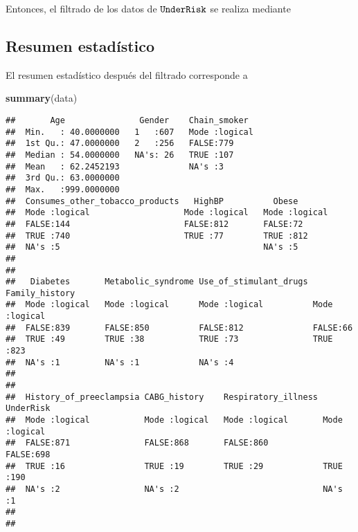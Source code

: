 \documentclass[
  spanish,
]{article}
\newenvironment{Shaded}{\begin{snugshade}}{\end{snugshade}}
\newcommand{\KeywordTok}[1]{\textcolor[rgb]{0.13,0.29,0.53}{\textbf{#1}}}
\newcommand{\NormalTok}[1]{#1}
\newcommand{\OperatorTok}[1]{\textcolor[rgb]{0.81,0.36,0.00}{\textbf{#1}}}
\newcommand{\StringTok}[1]{\textcolor[rgb]{0.31,0.60,0.02}{#1}}
\begin{document}
Entonces, el filtrado de los datos de \(\verb|UnderRisk|\) se realiza
mediante

\begin{Shaded}
\end{Shaded}

\newpage

\hypertarget{resumen-estaduxedstico}{%
\subsection{Resumen estadístico}\label{resumen-estaduxedstico}}

El resumen estadístico después del filtrado corresponde a

\begin{Shaded}
\begin{Highlighting}[]
\KeywordTok{summary}\NormalTok{(data)}
\end{Highlighting}
\end{Shaded}

\begin{verbatim}
##       Age               Gender    Chain_smoker   
##  Min.   : 40.0000000   1   :607   Mode :logical  
##  1st Qu.: 47.0000000   2   :256   FALSE:779      
##  Median : 54.0000000   NA's: 26   TRUE :107      
##  Mean   : 62.2452193              NA's :3        
##  3rd Qu.: 63.0000000                             
##  Max.   :999.0000000                             
##  Consumes_other_tobacco_products   HighBP          Obese        
##  Mode :logical                   Mode :logical   Mode :logical  
##  FALSE:144                       FALSE:812       FALSE:72       
##  TRUE :740                       TRUE :77        TRUE :812      
##  NA's :5                                         NA's :5        
##                                                                 
##                                                                 
##   Diabetes       Metabolic_syndrome Use_of_stimulant_drugs Family_history 
##  Mode :logical   Mode :logical      Mode :logical          Mode :logical  
##  FALSE:839       FALSE:850          FALSE:812              FALSE:66       
##  TRUE :49        TRUE :38           TRUE :73               TRUE :823      
##  NA's :1         NA's :1            NA's :4                               
##                                                                           
##                                                                           
##  History_of_preeclampsia CABG_history    Respiratory_illness UnderRisk      
##  Mode :logical           Mode :logical   Mode :logical       Mode :logical  
##  FALSE:871               FALSE:868       FALSE:860           FALSE:698      
##  TRUE :16                TRUE :19        TRUE :29            TRUE :190      
##  NA's :2                 NA's :2                             NA's :1        
##                                                                             
## 
\end{verbatim}
\end{document}
